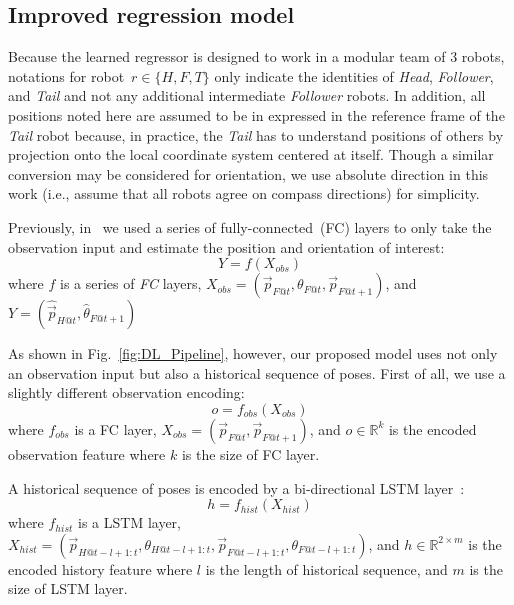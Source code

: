 \documentclass[letterpaper, 10 pt, conference]{ieeeconf}  %
\begin{document}
	\subsection{Improved regression model}
	\label{sec:regression_model}

    Because the learned regressor is designed to work in a modular team
    of $3$ robots, notations for robot~$r \in \{H, F, T\}$ only indicate
    the identities of \emph{Head}, \emph{Follower}, and \emph{Tail} and
    not any additional intermediate \emph{Follower} robots. In addition,
    all positions noted here are assumed to be in expressed in the
    reference frame of the \emph{Tail} robot because, in practice, the
    \emph{Tail} has to understand positions of others by projection onto
    the local coordinate system centered at itself. Though a similar
    conversion may be considered for orientation, we use absolute
    direction in this work (i.e., assume that all robots agree on
    compass directions) for simplicity.

	Previously, in~\cite{CPR17} we used a series of fully-connected~(FC) layers
	to only take the observation input and estimate the position and orientation
	of interest:
	\begin{equation}
	    Y = f(X_{obs})
	\end{equation}
    where $f$ is a series of \emph{FC} layers, $X_{obs} =
    (\vec{p}_{F@t}, \theta_{F@t}, \vec{p}_{F@t+1})$, and $Y =
    (\hat{\vec{p}}_{H@t}, \hat{\theta}_{F@t+1})$

	As shown in Fig.~\ref{fig:DL_Pipeline}, however, our proposed model uses not only
	an observation input but also a historical sequence of poses. First of all, we
	use a slightly different observation encoding:
	\begin{equation}
	    o = f_{obs}(X_{obs})
	\end{equation}
	where $f_{obs}$ is a FC layer,
	$X_{obs} = (\vec{p}_{F@t}, \vec{p}_{F@t+1})$,
	and $o \in \mathbb{R}^{k}$ is the encoded observation feature
	where $k$ is the size of FC layer.

    A historical sequence of poses is encoded by a bi-directional LSTM
    layer~\cite{Wu16}:
	\begin{equation}
	    h = f_{hist}(X_{hist})
	\end{equation}
    where $f_{hist}$ is a LSTM layer,
	$X_{hist} = (\vec{p}_{H@t-l+1:t}, \theta_{H@t-l+1:t},
	\vec{p}_{F@t-l+1:t}, \theta_{F@t-l+1:t})$,
	and $h \in \mathbb{R}^{2 \times m}$ is the encoded history feature
	where $l$ is the length of historical sequence,
	and $m$ is the size of LSTM layer.
\end{document}
